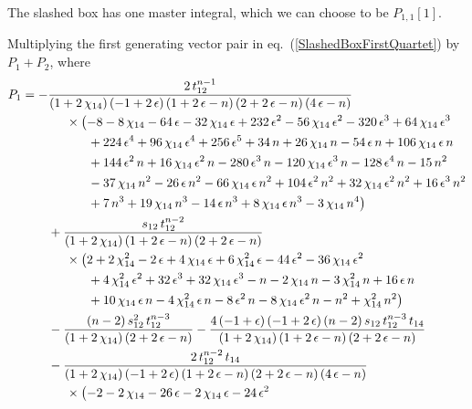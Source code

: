 \documentclass[aps,prd,preprint,groupedaddress,nofootinbib,showpacs,eqsecnum]{revtex4}
\def\eqn#1{eq.~(\ref{#1})}
\def\eps{\epsilon}
\def\Pn#1#2{P_{#1,#2}}
\begin{document}
The slashed box has one master integral, which we can choose to be $\Pn11[1]$.

\def\indentP{\hspace*{5mm}\times}
\def\indentPA{\hspace*{5mm}\hphantom{\times\Bigl()}}
Multiplying the first generating vector pair
in \eqn{SlashedBoxFirstQuartet} by
$P_1+P_2$, where 
\begin{equation}
\begin{aligned}
P_1 = 
-&\frac{2\,t_{12}^{n-1}}{(1+2\,\chi_{14})\,
	(-1+2\,\eps)\,(1+2\,\eps-n)\,(2+2\,\eps-n)\,(4\,\eps-n)}
\\&\indentP
\bigl(-8-8\,\chi_{14}-64\,\eps-32\,\chi_{14}\,\eps
+232\,\eps^{2}
-56\,\chi_{14}\,\eps^{2}-320\,\eps^{3}+64\,\chi_{14}\,\eps^{3}
\\ &\indentPA
+224\,\eps^{4}+96\,\chi_{14}\,\eps^{4}+256\,\eps^{5}+34\,n
+26\,\chi_{14}\,n-54\,\eps\,n+106\,\chi_{14}\,\eps\,n
\\ &\indentPA
+144\,\eps^{2}\,n+16\,\chi_{14}\,\eps^{2}\,n-280\,\eps^{3}\,n
-120\,\chi_{14}\,\eps^{3}\,n-128\,\eps^{4}\,n-15\,n^{2}
\\ &\indentPA
-37\,\chi_{14}\,n^{2}-26\,\eps\,n^{2}-66\,\chi_{14}\,\eps\,n^{2}
+104\,\eps^{2}\,n^{2}+32\,\chi_{14}\,\eps^{2}\,n^{2}+16\,\eps^{3}\,n^{2}
\\ &\indentPA
+7\,n^{3}+19\,\chi_{14}\,n^{3}-14\,\eps\,n^{3}
+8\,\chi_{14}\,\eps\,n^{3}-3\,\chi_{14}\,n^{4}\bigr)
\\&+\frac{s_{12}\,t_{12}^{n-2}}{(1+2\,\chi_{14})\,(1+2\,\eps-n)\,(2+2\,\eps-n)}
\\&\indentP\bigl(2+2\,\chi_{14}^{2}-2\,\eps+4\,\chi_{14}\,\eps
+6\,\chi_{14}^{2}\,\eps-44\,\eps^{2}-36\,\chi_{14}\,\eps^{2}
\\ &\indentPA
+4\,\chi_{14}^{2}\,\eps^{2}+32\,\eps^{3}+32\,\chi_{14}\,\eps^{3}-n
-2\,\chi_{14}\,n-3\,\chi_{14}^{2}\,n+16\,\eps\,n
\\ &\indentPA
+10\,\chi_{14}\,\eps\,n-4\,\chi_{14}^{2}\,\eps\,n-8\,\eps^{2}\,n
-8\,\chi_{14}\,\eps^{2}\,n-n^{2}+\chi_{14}^{2}\,n^{2}\bigr)
\\ &
-\frac{(n-2)\,s_{12}^{2}\,t_{12}^{n-3}}{(1+2\,\chi_{14})\,(2+2\,\eps-n)}
-\frac{4\,(-1+\eps)\,(-1+2\,\eps)\,(n-2)\,s_{12}\,t_{12}^{n-3}\,t_{14}}
{(1+2\,\chi_{14})\,(1+2\,\eps-n)\,(2+2\,\eps-n)}
\\&-\frac{2\,t_{12}^{n-2}\,t_{14}}
{(1+2\,\chi_{14})\,(-1+2\,\eps)\,(1+2\,\eps-n)\,(2+2\,\eps-n)\,(4\,\eps-n)}
\\&\indentP\bigl(-2-2\,\chi_{14}-26\,\eps-2\,\chi_{14}\,\eps-24\,\eps^{2}

\end{aligned}
\end{equation}
\end{document}
